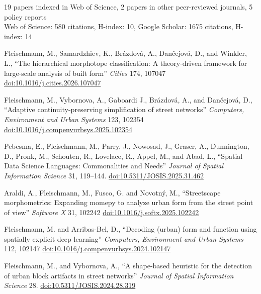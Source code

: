 \documentclass[11pt,a4paper]{report}
\begin{document}
    19 papers indexed in Web of Science, 2 papers in other peer-reviewed journals, 5 policy reports \\
    Web of Science: 580 citations, H-index: 10, Google Scholar: 1675 citations, H-index: 14

    \begin{tablist}

        \item[2026] \tab{}Fleischmann, M., Samardzhiev, K., Brázdová, A., Dančejová, D., and Winkler, L., \enquote{The hierarchical morphotope classification: A theory-driven framework for large-scale analysis of built form} \textit{Cities} 174, 107047 \href{https://doi.org/10.1016/j.cities.2026.107047}{doi:10.1016/j.cities.2026.107047}

        \item[2026] \tab{}Fleischmann, M., Vybornova, A., Gaboardi J., Brázdová, A., and Dančejová, D., \enquote{Adaptive continuity-preserving simplification of street networks} \textit{Computers, Environment and Urban Systems} 123, 102354 \href{https://doi.org/10.1016/j.compenvurbsys.2025.102354}{doi:10.1016/j.compenvurbsys.2025.102354}

        \item[2025] \tab{}Pebesma, E., Fleischmann, M., Parry, J., Nowosad, J., Graser, A., Dunnington, D., Pronk, M., Schouten, R., Lovelace, R., Appel, M., and Abad, L., \enquote{Spatial Data Science Languages: Commonalities and Needs} \textit{Journal of Spatial Information Science} 31, 119--144. \href{https://doi.org/10.5311/JOSIS.2025.31.462}{doi:10.5311/JOSIS.2025.31.462}

        \item[2025] \tab{}Araldi, A., Fleischmann, M., Fusco, G. and Novotný, M., \enquote{Streetscape morphometrics: Expanding momepy to analyze urban form from the street point of view} \textit{Software X} 31, 102242 \href{https://doi.org/10.1016/j.softx.2025.102242}{doi:10.1016/j.softx.2025.102242}

        \item[2024] \tab{}Fleischmann, M. and Arribas-Bel, D., \enquote{Decoding (urban) form and function using spatially explicit deep learning} \textit{Computers, Environment and Urban Systems} 112, 102147 \href{https://doi.org/10.1016/j.compenvurbsys.2024.102147}{doi:10.1016/j.compenvurbsys.2024.102147}

        \item[2024] \tab{}Fleischmann, M., and Vybornova, A., \enquote{A shape-based heuristic for the detection of urban block artifacts in street networks} \textit{Journal of Spatial Information Science} 28. \href{https://doi.org/10.5311/JOSIS.2024.28.319}{doi:10.5311/JOSIS.2024.28.319}


\end{tablist}
\end{document}
